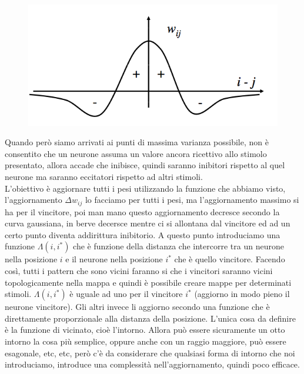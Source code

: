 \begin{figure}
\centering
\includegraphics[scale=0.5]{img/cappello.png}
\caption{}
\label{cappello}
\end{figure}
Quando però siamo arrivati ai punti di massima varianza possibile, non è consentito che un neurone assuma un valore ancora ricettivo allo stimolo presentato, allora accade che inibisce, quindi saranno inibitori rispetto al quel neurone ma saranno eccitatori rispetto ad altri stimoli.\\

\noindent L'obiettivo è aggiornare tutti i pesi utilizzando la funzione che abbiamo visto, l'aggiornamento $\Delta w_{ij}$ lo facciamo per tutti i pesi, ma l'aggiornamento massimo si ha per il vincitore, poi man mano questo aggiornamento decresce secondo la curva gaussiana, in berve decersce mentre ci si allontana dal vincitore ed ad un certo punto diventa addirittura inibitorio. A questo punto introduciamo una funzione $\Lambda(i, i^*)$ che è funzione della distanza che intercorre tra un neurone nella posizione $i$ e il neurone nella posizione $i^*$ che è quello vincitore. Facendo così, tutti i pattern che sono vicini faranno si che i vincitori saranno vicini topologicamente nella mappa e quindi è possibile creare mappe per determinati stimoli. $\Lambda(i, i^*)$ è uguale ad uno per il vincitore $i^*$ (aggiorno in modo pieno il neurone vincitore). Gli altri invece li aggiorno secondo una funzione che è direttamente proporzionale alla distanza della posizione. L'unica cosa da definire è la funzione di vicinato, cioè l'intorno. Allora può essere sicuramente un otto intorno la cosa più semplice, oppure anche con un raggio maggiore, può essere esagonale, etc, etc, però c'è da considerare che qualsiasi forma di intorno che noi introduciamo, introduce una complessità nell'aggiornamento, quindi poco efficace.\\ 


